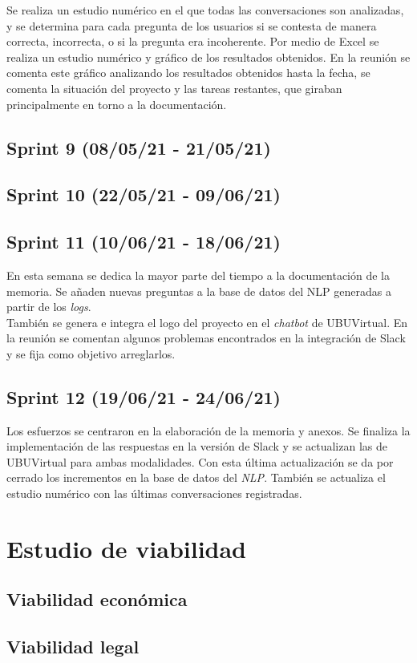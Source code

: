 Se realiza un estudio numérico en el que todas las conversaciones son analizadas, y se determina para cada pregunta de los usuarios si se contesta de manera correcta, incorrecta, o si la pregunta era incoherente. Por medio de Excel se realiza un estudio numérico y gráfico de los resultados obtenidos.
En la reunión se comenta este gráfico analizando los resultados obtenidos hasta la fecha, se comenta la situación del proyecto y las tareas restantes, que giraban principalmente en torno a la documentación.

\subsection{Sprint 9 (08/05/21 - 21/05/21)}

\subsection{Sprint 10 (22/05/21 - 09/06/21)}

\subsection{Sprint 11 (10/06/21 - 18/06/21)}

En esta semana se dedica la mayor parte del tiempo a la documentación de la memoria. Se añaden nuevas preguntas a la base de datos del NLP generadas a partir de los \textit{logs}.\\
También se genera e integra el logo del proyecto en el \textit{chatbot} de UBUVirtual.
En la reunión se comentan algunos problemas encontrados en la integración de Slack y se fija como objetivo arreglarlos.

\subsection{Sprint 12 (19/06/21 - 24/06/21)}

Los esfuerzos se centraron en la elaboración de la memoria y anexos. Se finaliza la implementación de las respuestas en la versión de Slack y se actualizan las de UBUVirtual para ambas modalidades. Con esta última actualización se da por cerrado los incrementos en la base de datos del \textit{NLP}. También se actualiza el estudio numérico con las últimas conversaciones registradas.


\newpage
\section{Estudio de viabilidad}

\subsection{Viabilidad económica}

\subsection{Viabilidad legal}


